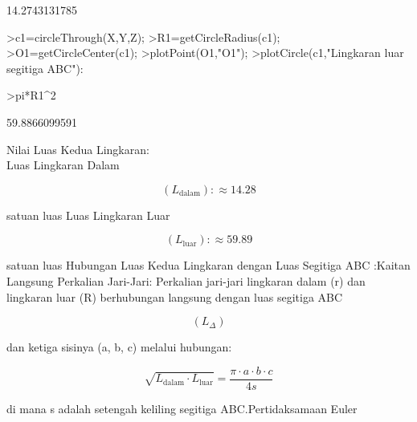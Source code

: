 \documentclass[a4paper,10pt]{article}
\begin{document}
\begin{eulernotebook}
\begin{euleroutput}
  14.2743131785
\end{euleroutput}
\begin{eulerprompt}
>c1=circleThrough(X,Y,Z);
>R1=getCircleRadius(c1);
>O1=getCircleCenter(c1);
>plotPoint(O1,"O1");
>plotCircle(c1,"Lingkaran luar segitiga ABC"):
\end{eulerprompt}
\begin{eulerprompt}
>pi*R1^2
\end{eulerprompt}
\begin{euleroutput}
  59.8866099591
\end{euleroutput}
\begin{eulercomment}
Nilai Luas Kedua Lingkaran:\\
Luas Lingkaran Dalam\\
\end{eulercomment}
\begin{eulerformula}
\[
(L_{\text{dalam}}): \approx 14.28
\]
\end{eulerformula}
\begin{eulercomment}
satuan luas   Luas Lingkaran Luar\\
\end{eulercomment}
\begin{eulerformula}
\[
(L_{\text{luar}}): \approx 59.89
\]
\end{eulerformula}
\begin{eulercomment}
satuan luas   Hubungan Luas Kedua Lingkaran dengan Luas Segitiga ABC
:Kaitan Langsung Perkalian Jari-Jari: Perkalian jari-jari lingkaran
dalam (r) dan lingkaran luar (R) berhubungan langsung dengan luas
segitiga ABC\\
\end{eulercomment}
\begin{eulerformula}
\[
(L_{\Delta})
\]
\end{eulerformula}
\begin{eulercomment}
dan ketiga sisinya (a, b, c) melalui hubungan:\\
\end{eulercomment}
\begin{eulerformula}
\[
\sqrt{L_{\text{dalam}} \cdot L_{\text{luar}}} = \frac{\pi \cdot a \cdot b \cdot c}{4s}
\]
\end{eulerformula}
\begin{eulercomment}
di mana s adalah setengah keliling segitiga ABC.Pertidaksamaan Euler
\end{eulercomment}
\begin{eulerformula}
\[
\]
\end{eulerformula}
\end{eulernotebook}
\end{document}
